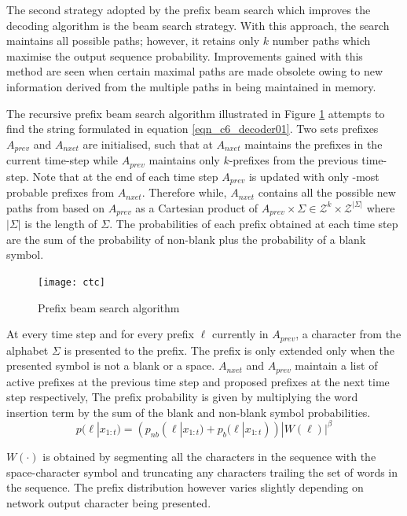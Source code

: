 {The second strategy adopted by the prefix beam search which improves the decoding algorithm is the beam search strategy.  With this approach, the search maintains all possible paths; however, it retains only $k$ number paths which maximise the output sequence probability.  Improvements gained with this method are seen when certain maximal paths are made obsolete owing to new information derived from the multiple paths in being maintained in memory. 

The recursive prefix beam search algorithm illustrated in Figure \ref{fig_c6_decoder01} attempts to find the string formulated in equation \ref{eqn_c6_decoder01}.  Two sets prefixes $A_{prev}$ and $A_{nxet}$ are initialised, such that at $A_{nxet}$ maintains the prefixes in the current time-step while $A_{prev}$ maintains only $k$-prefixes from the previous time-step.  Note that at the end of each time step $A_{prev}$ is updated with only -most probable prefixes from $A_{nxet}$. Therefore while,  $A_{nxet}$ contains all the possible new paths from based on $A_{prev}$ as a Cartesian product of $A_{prev} \times \Sigma \in \mathcal{Z}^k\times\mathcal{Z}^{|\Sigma|}$ where $|\Sigma|$ is the length of $\Sigma$. The probabilities of each prefix obtained at each time step are the sum of the probability of non-blank plus the probability of a blank symbol.
\begin{figure}
    \texttt{[image: ctc]}
    \caption{Prefix beam search algorithm}
    \label{fig_c6_decoder01}
\end{figure}

At every  time step and for every prefix $\ell$ currently in $A_{prev}$, a character from the alphabet $\Sigma$ is presented to the prefix. The prefix is only extended only when the presented symbol is not a blank or a space. $A_{nxet}$ and $A_{prev}$ maintain a list of active prefixes at the previous time step and proposed prefixes at the next time step respectively, The prefix probability is given by multiplying the word insertion term by the sum of the blank and non-blank symbol probabilities.
\begin{equation}
p(\ell|x_{1:t})=(p_{nb}(\ell|x_{1:t})+p_b(\ell|x_{1:t}))|W(\ell)|^\beta
\label{eqn_c6_decoder03}
\end{equation}

$W(\cdot)$ is obtained by segmenting all the characters in the sequence with the space-character symbol and truncating any characters trailing the  set of words in the sequence.  The prefix distribution however varies slightly depending on network output character being presented.

}
